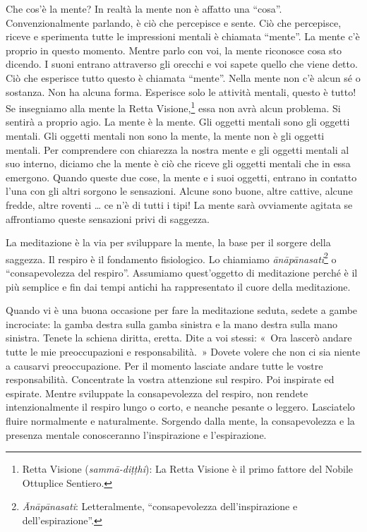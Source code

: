 Che cos'è la mente? In realtà la mente non è affatto una ``cosa''.
Convenzionalmente parlando, è ciò che percepisce e sente. Ciò che
percepisce, riceve e sperimenta tutte le impressioni mentali è chiamata
``mente''. La mente c'è proprio in questo momento. Mentre parlo con voi,
la mente riconosce cosa sto dicendo. I suoni entrano attraverso gli
orecchi e voi sapete quello che viene detto. Ciò che esperisce tutto
questo è chiamata ``mente''. Nella mente non c'è alcun sé o sostanza.
Non ha alcuna forma. Esperisce solo le attività mentali, questo è tutto!
Se insegniamo alla mente la Retta Visione,\footnote{Retta Visione
  (\emph{sammā-diṭṭhi}): La Retta Visione è il primo fattore del Nobile
  Ottuplice Sentiero.} essa non avrà alcun problema. Si sentirà a
proprio agio. La mente è la mente. Gli oggetti mentali sono gli oggetti
mentali. Gli oggetti mentali non sono la mente, la mente non è gli
oggetti mentali. Per comprendere con chiarezza la nostra mente e gli
oggetti mentali al suo interno, diciamo che la mente è ciò che riceve
gli oggetti mentali che in essa emergono. Quando queste due cose, la
mente e i suoi oggetti, entrano in contatto l'una con gli altri sorgono
le sensazioni. Alcune sono buone, altre cattive, alcune fredde, altre
roventi \ldots{} ce n'è di tutti i tipi! La mente sarà ovviamente agitata se
affrontiamo queste sensazioni privi di saggezza.

La meditazione è la via per sviluppare la mente, la base per il sorgere
della saggezza. Il respiro è il fondamento fisiologico. Lo chiamiamo
\emph{ānāpānasati}\footnote{\emph{Ānāpānasati}: Letteralmente,
  ``consapevolezza dell'inspirazione e dell'espirazione''.} o
``consapevolezza del respiro''. Assumiamo quest'oggetto di meditazione
perché è il più semplice e fin dai tempi antichi ha rappresentato il
cuore della meditazione.

Quando vi è una buona occasione per fare la meditazione seduta, sedete a
gambe incrociate: la gamba destra sulla gamba sinistra e la mano destra
sulla mano sinistra. Tenete la schiena diritta, eretta. Dite a voi
stessi: «~Ora lascerò andare tutte le mie preoccupazioni e
responsabilità.~» Dovete volere che non ci sia niente a causarvi
preoccupazione. Per il momento lasciate andare tutte le vostre
responsabilità. Concentrate la vostra attenzione sul respiro. Poi
inspirate ed espirate. Mentre sviluppate la consapevolezza del respiro,
non rendete intenzionalmente il respiro lungo o corto, e neanche pesante
o leggero. Lasciatelo fluire normalmente e naturalmente. Sorgendo dalla
mente, la consapevolezza e la presenza mentale conosceranno
l'inspirazione e l'espirazione.

